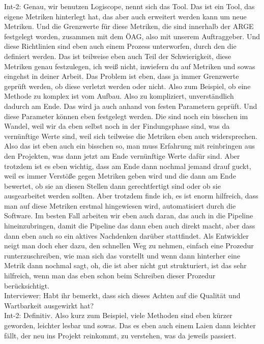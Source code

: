 Int-2: Genau, wir benutzen Logiscope, nennt sich das Tool. Das ist ein Tool, das eigene Metriken hinterlegt hat, das aber auch erweitert werden kann um neue Metriken. Und die Grenzwerte für diese Metriken, die sind innerhalb der ARGE festgelegt worden, zusammen mit dem ÖAG, also mit unserem Auftraggeber. Und diese Richtlinien sind eben auch einem Prozess unterworfen, durch den die definiert werden. Das ist teilweise eben auch Teil der Schwierigkeit, diese Metriken genau festzulegen, ich weiß nicht, inwiefern du auf Metriken und sowas eingehst in deiner Arbeit. Das Problem ist eben, dass ja immer Grenzwerte geprüft werden, ob diese verletzt werden oder nicht. Also zum Beispiel, ob eine Methode zu komplex ist vom Aufbau. Also zu kompliziert, unverständlich dadurch am Ende. Das wird ja auch anhand von festen Parametern geprüft. Und diese Parameter können eben festgelegt werden. Die sind noch ein bisschen im Wandel, weil wir da eben selbst noch in der Findungsphase sind, was da vernünftige Werte sind, weil sich teilweise die Metriken eben auch widersprechen. Also das ist eben auch ein bisschen so, man muss Erfahrung mit reinbringen aus den Projekten, was dann jetzt am Ende vernünftige Werte dafür sind. Aber trotzdem ist es eben wichtig, dass am Ende dann nochmal jemand drauf guckt, weil es immer Verstöße gegen Metriken geben wird und die dann am Ende bewertet, ob sie an diesen Stellen dann gerechtfertigt sind oder ob sie ausgearbeitet werden sollten. Aber trotzdem finde ich, es ist enorm hilfreich, dass man auf diese Metriken erstmal hingewiesen wird, automatisiert durch die Software. Im besten Fall arbeiten wir eben auch daran, das auch in die Pipeline hineinzubringen, damit die Pipeline das dann eben auch direkt macht, aber dass dann eben auch so ein aktives Nachdenken darüber stattfindet. Als Entwickler neigt man doch eher dazu, den schnellen Weg zu nehmen, einfach eine Prozedur runterzuschreiben, wie man sich das vorstellt und wenn dann hinterher eine Metrik dann nochmal sagt, oh, die ist aber nicht gut strukturiert, ist das sehr hilfreich, wenn man das eben schon beim Schreiben dieser Prozedur berücksichtigt. \\
Interviewer: Habt ihr bemerkt, dass sich dieses Achten auf die Qualität und Wartbarkeit ausgewirkt hat?\\
Int-2: Definitiv. Also kurz zum Beispiel, viele Methoden sind eben kürzer geworden, leichter lesbar und sowas. Das es eben auch einem Laien dann leichter fällt, der neu ins Projekt reinkommt, zu verstehen, was da jeweils passiert. \\
